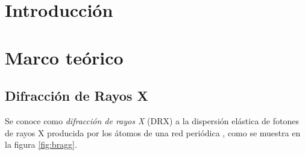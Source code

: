 \documentclass[final,5p,times,twocolumn, nopreprintline]{elsarticle}
\numberwithin{equation}{section}
\begin{document}



\section{Introducción}

\section{Marco teórico} 

\subsection{Difracción de Rayos X}

Se conoce como \emph{difracción de rayos X} (DRX) a la dispersión elástica de fotones de rayos X producida por los átomos de una red periódica \cite{chatterjee2000x}, como se muestra en la figura \ref{fig:bragg}.
\end{document}
